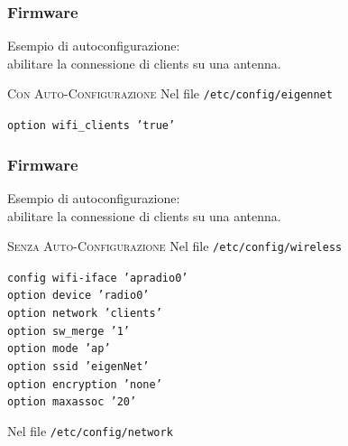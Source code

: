 \documentclass{beamer}
\begin{document}
\begin{frame}\frametitle{Firmware}
Esempio di autoconfigurazione:\\ {\color{blue}abilitare la connessione di clients su una antenna}.
\begin{block}{\textsc{Con Auto-Configurazione}}
\pause
Nel file \texttt{/etc/config/eigennet}

\texttt{option wifi\_clients '{\color{red}true}'}

\end{block}
\end{frame}

\logo{}
{
\begin{frame}\frametitle{Firmware}
Esempio di autoconfigurazione:\\ {\color{blue}abilitare la connessione di clients su una antenna}.
 \begin{alertblock}{\textsc{Senza Auto-Configurazione}}
\pause
{\small Nel file \texttt{/etc/config/wireless}}

\texttt{\tiny config wifi-iface 'apradio0'\\
\hspace{0.5cm}	option device 'radio0'\\
\hspace{0.5cm}	option network 'clients'\\
\hspace{0.5cm}	option sw\_merge '1'\\
\hspace{0.5cm}	option mode 'ap'\\
\hspace{0.5cm}	option ssid 'eigenNet'\\
\hspace{0.5cm}	option encryption 'none'\\
\hspace{0.5cm}	option maxassoc '20'\\}

{\small Nel file \texttt{/etc/config/network}}


\end{alertblock}
\end{frame}}
\end{document}
